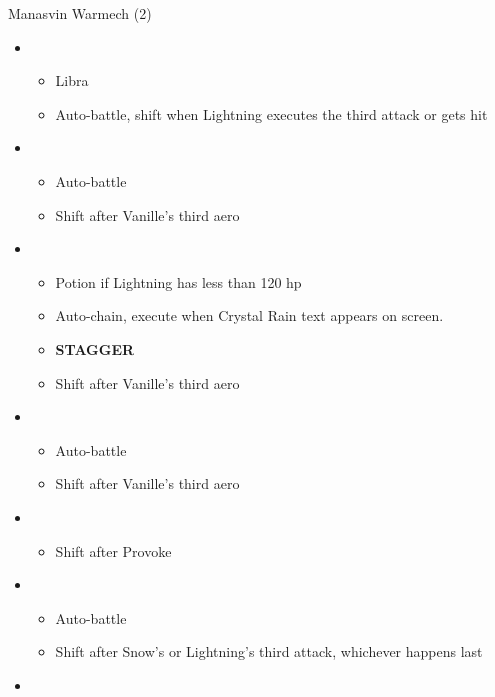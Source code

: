 \begin{multicols}{2}
  \begin{battle}{Manasvin Warmech (2)}
    \begin{itemize}
      \item \third
            \begin{itemize}
              \item Libra
              \item Auto-battle, shift when Lightning executes the third attack or gets hit
            \end{itemize}
      \item \fourth
            \begin{itemize}
              \item Auto-battle
              \item Shift after Vanille's third aero
            \end{itemize}
      \item \first
            \begin{itemize}
              \item Potion if Lightning has less than 120 hp
              \item Auto-chain, execute when Crystal Rain text appears on screen.
              \item \textbf{STAGGER}
              \item Shift after Vanille's third aero
            \end{itemize}
      \item \third
            \begin{itemize}
              \item Auto-battle
              \item Shift after Vanille's third aero
            \end{itemize}
      \item \second
            \begin{itemize}
              \item Shift after Provoke
            \end{itemize}
      \item \third
            \begin{itemize}
              \item Auto-battle
              \item Shift after Snow's or Lightning's third attack, whichever happens last
            \end{itemize}
      \item \fourth
            \begin{itemize}

\end{itemize}
\end{itemize}
\end{battle}
\end{multicols}
